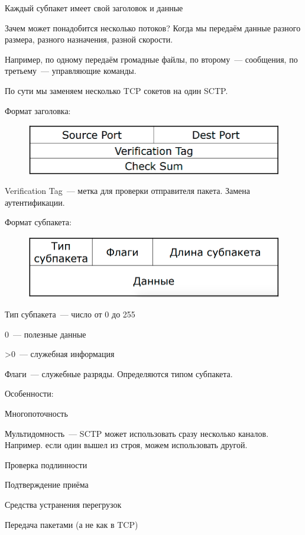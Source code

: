 Каждый субпакет имеет свой заголовок и данные

Зачем может понадобится несколько потоков? Когда мы передаём данные разного размера, разного назначения, разной скорости.

Например, по одному передаём громадные файлы, по второму~--- сообщения, по третьему~--- управляющие команды.

По сути мы заменяем несколько TCP сокетов на один SCTP.

Формат заголовка:

\begin{figure}[H]
  \centering
  \includegraphics[width=15cm]{images/03/08}
\end{figure}

Verification Tag~--- метка для проверки отправителя пакета. Замена аутентификации.

Формат субпакета:

\begin{figure}[H]
  \centering
  \includegraphics[width=15cm]{images/03/09}
\end{figure}

Тип субпакета~--- число от 0 до 255
\begin{MyItemize}
    \item 0~--- полезные данные
    \item >0~--- служебная информация
\end{MyItemize}

Флаги~--- служебные разряды. Определяются типом субпакета.

Особенности:
\begin{MyItemize}
    \item Многопоточность
    \item Мультидомность~--- SCTP может использовать сразу несколько каналов. Например. если один вышел из строя, можем использовать другой.
    \item Проверка подлинности
    \item Подтверждение приёма
    \item Средства устранения перегрузок
    \item Передача пакетами (а не как в TCP)
\end{MyItemize}